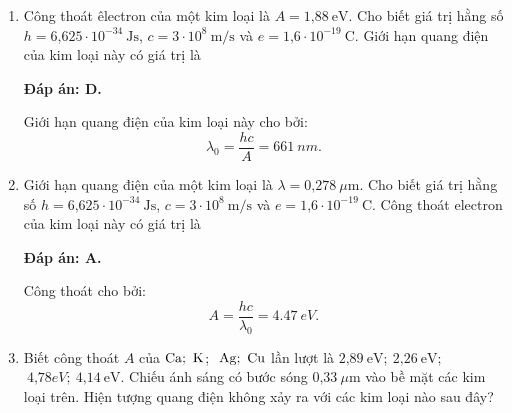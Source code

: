 \begin{enumerate}[label=\bfseries Câu \arabic*:]
{	}
	
	\item {} 
	
	\cauhoi
	{Công thoát êlectron của một kim loại là $A=\text{1,88}\ \text{eV}$. Cho biết giá trị hằng số $h=\text{6,625}\cdot 10^{-34}\ \text{Js}$, $c=3\cdot 10^8\ \text{m/s}$ và $e=\text{1,6}\cdot 10^{-19}\ \text{C}$. Giới hạn quang điện của kim loại này có giá trị là
	}
	
	\loigiai
	{		\textbf{Đáp án: D.}
		
Giới hạn quang điện của kim loại này cho bởi:
$$
	\lambda_{0} = \dfrac{hc}{A} = \SI{661}{nm}.
$$
		
	}
	
	\item {} 
	
	\cauhoi
	{Giới hạn quang điện của một kim loại là $\lambda =\text{0,278}\ \mu\text{m}$. Cho biết giá trị hằng số $h=\text{6,625}\cdot 10^{-34}\ \text{Js}$, $c=3\cdot 10^8\ \text{m/s}$ và $e=\text{1,6}\cdot 10^{-19}\ \text{C}$. Công thoát electron của kim loại này có giá trị là
	}
	
	\loigiai
	{		\textbf{Đáp án: A.}
		
Công thoát cho bởi:
$$
	A = \dfrac{hc}{\lambda_{0}} = \SI{4,47}{eV}.
$$
		
	}
	
	\item {}
	
	\cauhoi
	{Biết công thoát $A$ của $\ce{Ca};\ \ce{K}$; $\ \ce{Ag};\ \ce{Cu}$ lần lượt là $\text{2,89}\ \text{eV};\ \text{2,26}\ \text{eV};$ $\ \text{4,78} eV;\ \text{4,14}\ \text{eV}$. Chiếu ánh sáng có bước sóng $\text{0,33}\ \mu\text{m}$ vào bề mặt các kim loại trên. Hiện tượng quang điện không xảy ra với các kim loại nào sau đây?
	}
	

\end{enumerate}
